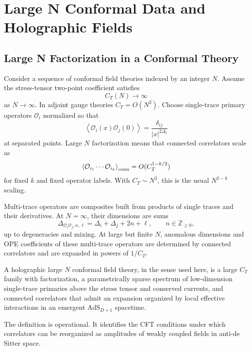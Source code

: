 \chapter{Large N Conformal Data and Holographic Fields}
\label{ch:volume-iii-large-n-conformal-data-holographic-fields}

\section{Large N Factorization in a Conformal Theory}

Consider a sequence of conformal field theories indexed by an integer \(N\).
Assume the stress-tensor two-point coefficient satisfies
\[
  C_T(N)\longrightarrow\infty
\]
as \(N\to\infty\).  In adjoint gauge theories \(C_T=O(N^2)\).  Choose
single-trace primary operators \(\mathcal O_i\) normalized so that
\[
  \left\langle\mathcal O_i(x)\mathcal O_j(0)\right\rangle
  =
  \frac{\delta_{ij}}{|x|^{2\Delta_i}}
\]
at separated points.  Large \(N\) factorization means that connected
correlators scale as
\begin{equation}
  \left\langle
    \mathcal O_{i_1}\cdots\mathcal O_{i_k}
  \right\rangle_{\rm conn}
  =
  O(C_T^{1-k/2})
  \label{eq:large-n-ct-factorization}
\end{equation}
for fixed \(k\) and fixed operator labels.  With \(C_T\sim N^2\), this is the
usual \(N^{2-k}\) scaling.

Multi-trace operators are composites built from products of single traces and
their derivatives.  At \(N=\infty\), their dimensions are sums
\[
  \Delta_{\mathcal O_i\mathcal O_j,n,\ell}
  =
  \Delta_i+\Delta_j+2n+\ell,
  \qquad
  n\in\mathbb Z_{\ge0},
\]
up to degeneracies and mixing.  At large but finite \(N\), anomalous
dimensions and OPE coefficients of these multi-trace operators are determined
by connected correlators and are expanded in powers of \(1/C_T\).

\begin{definition}
  A holographic large \(N\) conformal field theory, in the sense used here, is
  a large \(C_T\) family with factorization, a parametrically sparse spectrum
  of low-dimension single-trace primaries above the stress tensor and
  conserved currents, and connected correlators that admit an expansion
  organized by local effective interactions in an emergent
  \(\mathrm{AdS}_{D+1}\) spacetime.
\end{definition}

The definition is operational.  It identifies the CFT conditions under which
correlators can be reorganized as amplitudes of weakly coupled fields in
anti-de Sitter space.

